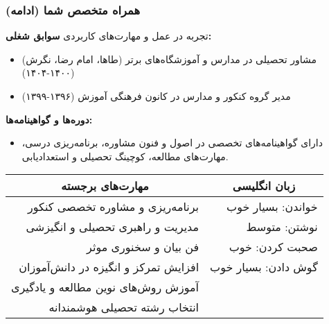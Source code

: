 \documentclass[aspectratio=169]{beamer}
\begin{document}
\begin{frame}[fragile]
  \frametitle{همراه متخصص شما (ادامه)}

  \begin{block}{تجربه در عمل و مهارت‌های کاربردی}
    \scriptsize
    \textbf{سوابق شغلی:}
    \begin{itemize}\setlength{\itemsep}{-3pt} %
      \item مشاور تحصیلی در مدارس و آموزشگاه‌های برتر (طاها، امام رضا، نگرش) (۱۴۰۰-۱۴۰۴)
      \item مدیر گروه کنکور و مدارس در کانون فرهنگی آموزش (۱۳۹۶-۱۳۹۹)
    \end{itemize}
    \textbf{دوره‌ها و گواهینامه‌ها:}
    \begin{itemize}\setlength{\itemsep}{-3pt} %
      \item دارای گواهینامه‌های تخصصی در اصول و فنون مشاوره، برنامه‌ریزی درسی، مهارت‌های مطالعه، کوچینگ تحصیلی و استعدادیابی.
    \end{itemize}

    \vspace{-0.5cm}

    \scriptsize %
    \begin{center}
      \begin{tabular}{r|r}
        \multicolumn{1}{c|}{\textbf{مهارت‌های برجسته}} & \multicolumn{1}{c}{\textbf{زبان انگلیسی}} \\
        \hline
        برنامه‌ریزی و مشاوره تخصصی کنکور & خواندن: بسیار خوب \\
        مدیریت و راهبری تحصیلی و انگیزشی & نوشتن: متوسط \\
        فن بیان و سخنوری موثر & صحبت کردن: خوب \\
        افزایش تمرکز و انگیزه در دانش‌آموزان & گوش دادن: بسیار خوب \\
        آموزش روش‌های نوین مطالعه و یادگیری & ~ \\
        انتخاب رشته تحصیلی هوشمندانه & ~ \\
      \end{tabular}
    \end{center}
    \normalsize %
  \end{block}
\end{frame}
\end{document}
